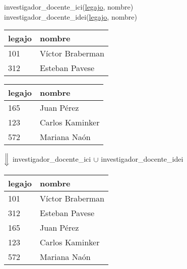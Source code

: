 \documentclass[preview]{standalone}
\begin{document}
investigador\_docente\_ici(\underline{legajo}, nombre)\\
investigador\_docente\_idei(\underline{legajo}, nombre)

\begin{center}
\begin{tabular}{| l | l | }\hline			
	legajo & nombre \\\hline			
	101 & V\'ictor Braberman \\
	312 & Esteban Pavese \\\hline
\end{tabular}
\quad
\begin{tabular}{| l | l | }\hline			
	legajo & nombre \\\hline			
	165 & Juan P\'erez \\
	123 & Carlos Kaminker \\
	572 & Mariana Na\'on \\\hline
\end{tabular}
\vspace{.35cm}

$\Big\Downarrow$ investigador\_docente\_ici ${\Large\cup}$ investigador\_docente\_idei 
\vspace{.35cm}

\begin{tabular}{| l | l | }\hline			
	legajo & nombre \\\hline			
	101 & V\'ictor Braberman \\
	312 & Esteban Pavese \\
	165 & Juan P\'erez \\
	123 & Carlos Kaminker \\
	572 & Mariana Na\'on \\\hline
\end{tabular}
\end{center}
\end{document}
